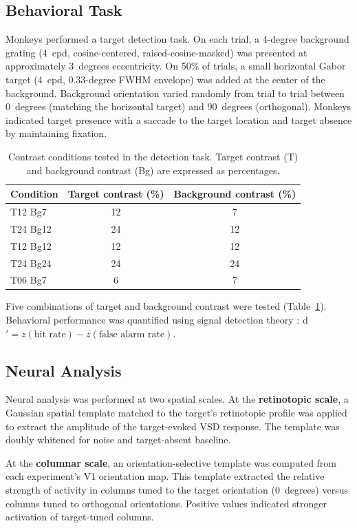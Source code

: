 \documentclass[11pt]{article}
\begin{document}
\subsection{Behavioral Task}

Monkeys performed a target detection task. On each trial, a 4-degree background grating (4~cpd, cosine-centered, raised-cosine-masked) was presented at approximately 3~degrees eccentricity. On 50\% of trials, a small horizontal Gabor target (4~cpd, 0.33-degree FWHM envelope) was added at the center of the background. Background orientation varied randomly from trial to trial between 0~degrees (matching the horizontal target) and 90~degrees (orthogonal). Monkeys indicated target presence with a saccade to the target location and target absence by maintaining fixation.

\begin{table}[ht]
\centering
\caption{Contrast conditions tested in the detection task. Target contrast (T) and background contrast (Bg) are expressed as percentages.}
\label{tab:contrast}
\begin{tabular}{lcc}
\toprule
Condition & Target contrast (\%) & Background contrast (\%) \\
\midrule
T12 Bg7  & 12 & 7 \\
T24 Bg12 & 24 & 12 \\
T12 Bg12 & 12 & 12 \\
T24 Bg24 & 24 & 24 \\
T06 Bg7  & 6  & 7 \\
\bottomrule
\end{tabular}
\end{table}

Five combinations of target and background contrast were tested (Table~\ref{tab:contrast}). Behavioral performance was quantified using signal detection theory \citep{green1966}: d$' = z(\text{hit rate}) - z(\text{false alarm rate})$.

\subsection{Neural Analysis}

Neural analysis was performed at two spatial scales. At the \textbf{retinotopic scale}, a Gaussian spatial template matched to the target's retinotopic profile was applied to extract the amplitude of the target-evoked VSD response. The template was doubly whitened for noise and target-absent baseline.

At the \textbf{columnar scale}, an orientation-selective template was computed from each experiment's V1 orientation map. This template extracted the relative strength of activity in columns tuned to the target orientation (0~degrees) versus columns tuned to orthogonal orientations. Positive values indicated stronger activation of target-tuned columns.
\end{document}
